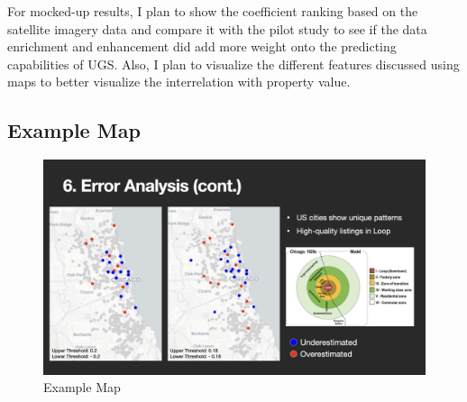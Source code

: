 \documentclass{article}
\begin{document}
For mocked-up results, I plan to show the coefficient ranking based on the satellite imagery data and compare it with the pilot study to see if the data enrichment and enhancement did add more weight onto the predicting capabilities of UGS. Also, I plan to visualize the different features discussed using maps to better visualize the interrelation with property value.

\subsection*{Example Map}
\begin{figure}[h]
  \centering
  \includegraphics[width=\textwidth]{Visual/examplemap.jpeg}
  \caption{Example Map}
\end{figure}
\end{document}
